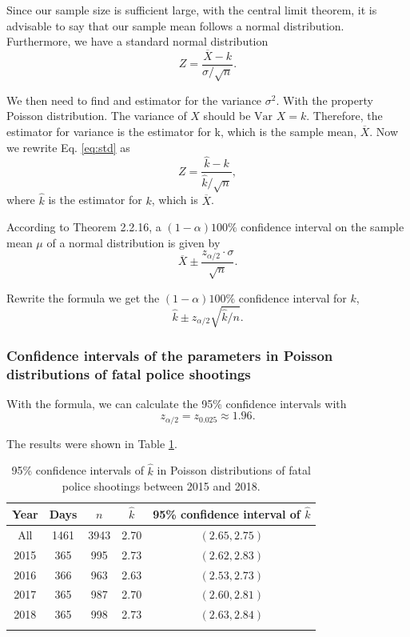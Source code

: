 \documentclass[conf]{new-aiaa}
\begin{document}
Since our sample size is sufficient large, with the central limit theorem, it is advisable to say that our sample mean follows a normal distribution. Furthermore, we have a standard normal distribution
\begin{equation}\label{eq:std}
    Z=\frac{\overline{X}-k}{\sigma / \sqrt{n}}. 
\end{equation}

We then need to find and estimator for the variance $\sigma^2$. With the property Poisson distribution. The variance of $X$ should be $\text{Var }X = k$. Therefore, the estimator for variance is the estimator for k, which is the sample mean, $\overline{X}$. Now we rewrite Eq. \ref{eq:std} as 
\begin{equation}
Z = \frac{\hat{k}-k}{ \hat{k}/ \sqrt{n}},
\end{equation}
where $\hat{k}$ is the estimator for $k$, which is $\overline{X}$.\medskip

According to Theorem 2.2.16\cite{horst}, a $(1 - \alpha)100\%$
confidence interval on the sample mean $\mu$ of a normal distribution is given by 
\begin{equation}\label{eq:ci}
\overline{X}\pm\frac{z_{\alpha/2}\cdot\sigma}{\sqrt{n}}.
\end{equation}

Rewrite the formula we get the $(1 - \alpha)100\%$
confidence interval for $k$,
\begin{equation}
\hat{k} \pm z_{\alpha / 2} \sqrt{\hat{k} / n}.
\end{equation}

\subsubsection{Confidence intervals of the parameters in Poisson distributions of fatal police shootings}

With the formula, we can calculate the 95\% confidence intervals with
$$z_{\alpha/2}=z_{0.025}\approx1.96.$$

The results were shown in Table \ref{tab:q5}.\medskip

\begin{table}[!htbp]
\centering
\begin{tabular}{ccccc}
\toprule 
\toprule
Year & Days & $n$ & $\hat{k}$ & 95\% confidence interval of $\hat{k}$ \\
\hline
All & 1461 & 3943 & 2.70 & $(2.65,2.75)$\\
2015 & 365 & 995  & 2.73 & $(2.62,2.83)$\\
2016 & 366 & 963  & 2.63 & $(2.53,2.73)$\\
2017 & 365 & 987  & 2.70 & $(2.60,2.81)$\\
2018 & 365 & 998  & 2.73 & $(2.63,2.84)$\\
\bottomrule 
\bottomrule\noalign{\bigskip}
\end{tabular}
\caption{95\% confidence intervals of $\hat{k}$ in Poisson distributions of fatal police shootings between 2015 and 2018.}
\label{tab:q5}
\end{table}
\end{document}
